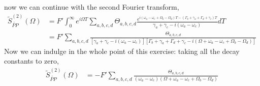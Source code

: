 now we can continue with the second Fourier transform,
\begin{align}
	 \tilde{S}^{(2)}_{\tilde{PP}}( \Omega )&=F' \int_{0}^{\infty} e^{i \Omega T} \sum_{a,b, c, d} \Theta_{a,b, c, d}   \frac{e^{i \left( \omega_a - \omega_c + \Omega_b - \Omega_d \right)T -  \left( \Gamma_b + \gamma_a + \Gamma_d + \gamma_c \right)T}}{\gamma_a + \gamma_c - i (\omega_a - \omega_c) } dT\\
	 &=F' \sum_{a,b, c, d}   \frac{ \Theta_{a,b, c, d}   }{\left[ \gamma_a + \gamma_c - i (\omega_a - \omega_c) \right] \left[ \Gamma_b + \gamma_a + \Gamma_d + \gamma_c  - i ( \Omega + \omega_a - \omega_c + \Omega_b - \Omega_d ) \right] }
\end{align}
Now we can indulge in the whole point of this exercise: taking all the decay constants to zero,
\begin{align}
	 \tilde{S}^{(2)}_{\tilde{PP}}( \Omega )&=-F' \sum_{a,b, c, d}   \frac{ \Theta_{a,b, c, d}   }{  (\omega_a - \omega_c)  ( \Omega + \omega_a - \omega_c + \Omega_b - \Omega_d )}
\end{align}


